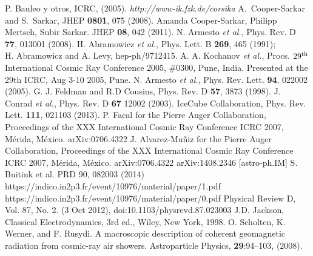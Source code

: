 \begin{thebibliography}{1}
 P. Bauleo y otros, ICRC, (2005).
 \emph{http://www-ik.fzk.de/corsika}
 A.~Cooper-Sarkar and S.~Sarkar, JHEP {\bf 0801}, 075 (2008).
Amanda Cooper-Sarkar, Philipp Mertsch, Subir Sarkar. JHEP \textbf{08}, 042 (2011).
 N. Armesto {\it et al.}, Phys. Rev. D \textbf{77}, 013001 (2008).
 H. Abramowicz {\it et al.}, Phys. Lett. B \textbf{269}, 465  (1991);\\ H. Abramowicz and A. Levy, hep-ph/9712415. A. A. Kochanov {\it et al.}, Procs. $29^{\rm th}$ International Cosmic Ray Conference 2005, $\#$0300, Pune, India. Presented at the 29th ICRC, Aug 3-10 2005, Pune.
 N. Armesto {\it et al.}, Phys. Rev. Lett. \textbf{94}, 022002 (2005).
 G. J. Feldman and R.D Cousins, Phys. Rev. D \textbf{57}, 3873 (1998).
 J. Conrad {\it et al.}, Phys. Rev. D \textbf{67} 12002 (2003).
 IceCube Collaboration, Phys. Rev. Lett. \textbf{111}, 021103 (2013).
 P. Facal for the Pierre Auger Collaboration, Proceedings of the XXX International Cosmic Ray Conference ICRC 2007, M\'erida, M\'exico. arXiv:0706.4322
 J. Alvarez-Mu\~niz for the Pierre Auger Collaboration, Proceedings of the XXX International Cosmic Ray Conference ICRC 2007, M\'erida, M\'exico. arXiv:0706.4322
 arXiv:1408.2346 [astro-ph.IM]
 S. Buitink et al. PRD 90, 082003 (2014)
 https://indico.in2p3.fr/event/10976/material/paper/1.pdf
 https://indico.in2p3.fr/event/10976/material/paper/0.pdf
 Physical Review D, Vol. 87, No. 2. (3 Oct 2012), doi:10.1103/physrevd.87.023003 
 J.D. Jackson, Classical Electrodynamics, 3rd ed., Wiley, New York, 1998.
 O. Scholten, K. Werner, and F. Rusydi. A macroscopic description of coherent geomagnetic radiation from cosmic-ray air showers. Astroparticle Physics, {\bf 29}:94–103, (2008).

\end{thebibliography}
